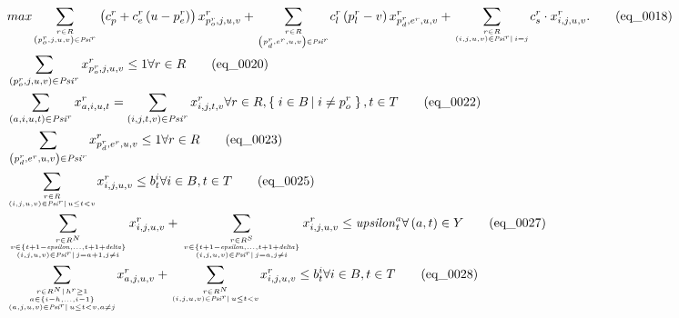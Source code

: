 \begin{align}
  & max \underset{\genfrac{}{}{0pt}{}{r \in R}{\left(p_{o}^{r} , j , u , v\right) \in \mathit{Psi}^{r}}}{\sum} \left(c_{p}^{r} + c_{e}^{r} \left(u - p_{e}^{r}\right)\right) x_{p_{o}^{r} , j , u , v}^{r} + \underset{\genfrac{}{}{0pt}{}{r \in R}{\left(p_{d}^{r} , e^{r} , u , v\right) \in \mathit{Psi}^{r}}}{\sum} c_{l}^{r} \left(p_{l}^{r} - v\right) x_{p_{d}^{r} , e^{r} , u , v}^{r} + \underset{\genfrac{}{}{0pt}{}{r \in R}{\left(i , j , u , v\right) \in \mathit{Psi}^{r} \left|\right. i = j}}{\sum} c_{s}^{r} \cdot x_{i , j , u , v}^{r} . \tag{eq\_0018} \\
  & \sum_{\left(p_{o}^{r} , j , u , v\right) \in \mathit{Psi}^{r}} x_{p_{o}^{r} , j , u , v}^{r} \leq 1 \forall r \in R \tag{eq\_0020} \\
  & \sum_{\left(a , i , u , t\right) \in \mathit{Psi}^{r}} x_{a , i , u , t}^{r} = \sum_{\left(i , j , t , v\right) \in \mathit{Psi}^{r}} x_{i , j , t , v}^{r} \forall r \in R , \left\{\right. i \in B \left|\right. i \neq p_{o}^{r} \left.\right\} , t \in T \tag{eq\_0022} \\
  & \sum_{\left(p_{d}^{r} , e^{r} , u , v\right) \in \mathit{Psi}^{r}} x_{p_{d}^{r} , e^{r} , u , v}^{r} \leq 1 \forall r \in R \tag{eq\_0023} \\
  & \underset{\genfrac{}{}{0pt}{}{r \in R}{\left(i , j , u , v\right) \in \mathit{Psi}^{r} \left|\right. u \leq t < v}}{\sum} x_{i , j , u , v}^{r} \leq b_{t}^{i} \forall i \in B , t \in T \tag{eq\_0025} \\
  & \underset{\genfrac{}{}{0pt}{}{\genfrac{}{}{0pt}{}{r \in R^{N}}{v \in \left\{t + 1 - \mathit{epsilon} , \ldots , t + 1 + \mathit{delta}\right\}}}{\left(i , j , u , v\right) \in \mathit{Psi}^{r} \left|\right. j = a + 1 , j \neq i}}{\sum} x_{i , j , u , v}^{r} + \underset{\genfrac{}{}{0pt}{}{\genfrac{}{}{0pt}{}{r \in R^{S}}{v \in \left\{t + 1 - \mathit{epsilon} , \ldots , t + 1 + \mathit{delta}\right\}}}{\left(i , j , u , v\right) \in \mathit{Psi}^{r} \left|\right. j = a , j \neq i}}{\sum} x_{i , j , u , v}^{r} \leq \mathit{upsilon}_{t}^{a} \forall \left(a , t\right) \in Y \tag{eq\_0027} \\
  & \underset{\genfrac{}{}{0pt}{}{\genfrac{}{}{0pt}{}{r \in R^{N} \left|\right. h^{r} \geq 1}{a \in \left\{i - h , \ldots , i - 1\right\}}}{\left(a , j , u , v\right) \in \mathit{Psi}^{r} \left|\right. u \leq t < v , a \neq j}}{\sum} x_{a , j , u , v}^{r} + \underset{\genfrac{}{}{0pt}{}{r \in R^{N}}{\left(i , j , u , v\right) \in \mathit{Psi}^{r} \left|\right. u \leq t < v}}{\sum} x_{i , j , u , v}^{r} \leq b_{t}^{i} \forall i \in B , t \in T \tag{eq\_0028} \\

\end{align}
